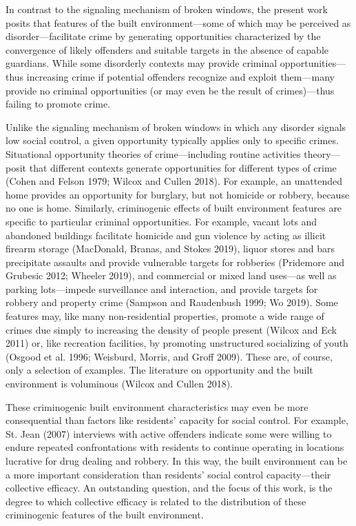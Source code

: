 \documentclass [11pt, proquest] {uwthesis}[2015/03/03]
\begin{document}
In contrast to the signaling mechanism of broken windows, the present work posits that features of the built environment---some of which may be perceived as disorder---facilitate crime by generating opportunities characterized by the convergence of likely offenders and suitable targets in the absence of capable guardians. While some disorderly contexts may provide criminal opportunities---thus increasing crime if potential offenders recognize and exploit them---many provide no criminal opportunities (or may even be the result of crimes)---thus failing to promote crime.

Unlike the signaling mechanism of broken windows in which any disorder signals low social control, a given opportunity typically applies only to specific crimes. Situational opportunity theories of crime---including routine activities theory---posit that different contexts generate opportunities for different types of crime (Cohen and Felson 1979; Wilcox and Cullen 2018). For example, an unattended home provides an opportunity for burglary, but not homicide or robbery, because no one is home. Similarly, criminogenic effects of built environment features are specific to particular criminal opportunities. For example, vacant lots and abandoned buildings facilitate homicide and gun violence by acting as illicit firearm storage (MacDonald, Branas, and Stokes 2019), liquor stores and bars precipitate assaults and provide vulnerable targets for robberies (Pridemore and Grubesic 2012; Wheeler 2019), and commercial or mixed land uses---as well as parking lots---impede surveillance and interaction, and provide targets for robbery and property crime (Sampson and Raudenbush 1999; Wo 2019). Some features may, like many non-residential properties, promote a wide range of crimes due simply to increasing the density of people present (Wilcox and Eck 2011) or, like recreation facilities, by promoting unstructured socializing of youth (Osgood et al. 1996; Weisburd, Morris, and Groff 2009). These are, of course, only a selection of examples. The literature on opportunity and the built environment is voluminous (Wilcox and Cullen 2018).

These criminogenic built environment characteristics may even be more consequential than factors like residents' capacity for social control. For example, St. Jean (2007) interviews with active offenders indicate some were willing to endure repeated confrontations with residents to continue operating in locations lucrative for drug dealing and robbery. In this way, the built environment can be a more important consideration than residents' social control capacity---their collective efficacy. An outstanding question, and the focus of this work, is the degree to which collective efficacy is related to the distribution of these criminogenic features of the built environment.
\end{document}
